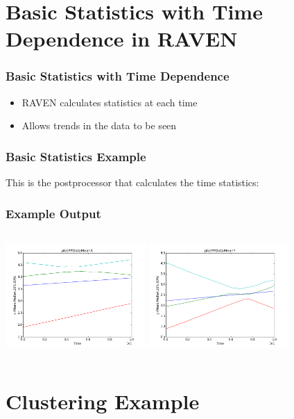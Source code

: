 \documentclass[t,9pt,svgnames]{beamer}
\begin{document}
\section{Basic Statistics with Time Dependence in RAVEN}

\begin{frame}
  \frametitle{Basic Statistics with Time Dependence}
  \begin{itemize}
  \item RAVEN calculates statistics at each time
  \item Allows trends in the data to be seen
  \end{itemize}
\end{frame}

\begin{frame}[fragile]
  \frametitle{Basic Statistics Example}
  This is the postprocessor that calculates the time statistics:
  

\end{frame}

\begin{frame}
  \frametitle{Example Output}
  \begin{columns}
    \includegraphics[height=4cm]{images/plotPPDataMeanX.png}
    \includegraphics[height=4cm]{images/plotPPDataMeanY.png}
  \end{columns}
\end{frame}

\section{Clustering Example}
\end{document}
